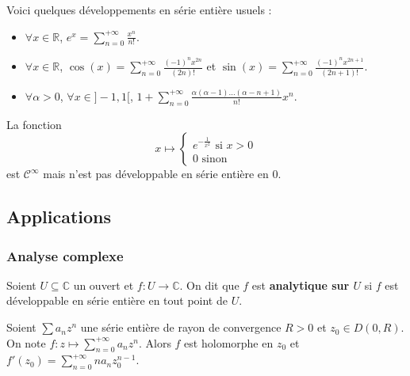 	\begin{example}
		Voici quelques développements en série entière usuels :
		\begin{itemize}
			\item $\forall x \in \mathbb{R}$, $e^x = \sum_{n=0}^{+\infty} \frac{x^n}{n!}$.
			\item $\forall x \in \mathbb{R}$, $\cos(x) = \sum_{n=0}^{+\infty} \frac{(-1)^n x^{2n}}{(2n)!}$ et $\sin(x) = \sum_{n=0}^{+\infty} \frac{(-1)^n x^{2n+1}}{(2n+1)!}$.
			\item $\forall \alpha > 0$, $\forall x \in ]-1,1[$, $1 + \sum_{n=0}^{+\infty} \frac{\alpha(\alpha - 1) \dots (\alpha - n + 1)}{n!} x^n$.
		\end{itemize}
	\end{example}
	
	
	\begin{cexample}
		La fonction 
		\[
		x \mapsto \begin{cases}
			e^{-\frac{1}{x^2}} \text{ si } x > 0 \\
			0 \text{ sinon}
		\end{cases}
		\]
		est $\mathcal{C}^\infty$ mais n'est pas développable en série entière en $0$.
	\end{cexample}
	
	\subsection{Applications}
	
	\subsubsection{Analyse complexe}
	
	
	\begin{definition}
		Soient $U \subseteq \mathbb{C}$ un ouvert et $f : U \rightarrow \mathbb{C}$. On dit que $f$ est \textbf{analytique sur $U$} si $f$ est développable en série entière en tout point de $U$.
	\end{definition}
	
	\begin{theorem}
		Soient $\sum a_n z^n$ une série entière de rayon de convergence $R > 0$ et $z_0 \in D(0,R)$. On note $f : z \mapsto \sum_{n=0}^{+\infty} a_n z^n$.
		Alors $f$ est holomorphe en $z_0$ et $f'(z_0) = \sum_{n=0}^{+\infty} n a_n z_0^{n-1}$.
	\end{theorem}
	
